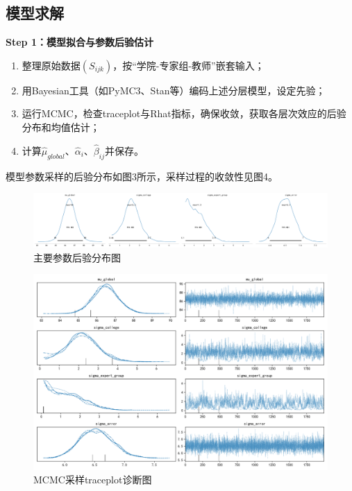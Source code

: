 \documentclass[withoutpreface,bwprint]{cumcmthesis}
\begin{document}
\subsection{模型求解}
\textbf{Step 1：模型拟合与参数后验估计}
\begin{enumerate}
    \item 整理原始数据$(S_{ijk})$，按“学院-专家组-教师”嵌套输入；
    \item 用Bayesian工具（如PyMC3、Stan等）编码上述分层模型，设定先验；
    \item 运行MCMC，检查traceplot与Rhat指标，确保收敛，获取各层次效应的后验分布和均值估计；
    \item 计算$\widehat{\mu}_{global}$、$\widehat{\alpha}_{i}$、$\widehat{\beta}_{ij}$并保存。
\end{enumerate}

模型参数采样的后验分布如图3所示，采样过程的收敛性见图4。

\begin{figure}[H]
\centering
\includegraphics[width=1\textwidth]{figures/Diagnostics/posterior_plots.png}
\caption{主要参数后验分布图}
\label{fig:posterior_plots}
\end{figure}

\begin{figure}[H]
\centering
\includegraphics[width=1\textwidth]{figures/Diagnostics/trace_plots.png}
\caption{MCMC采样traceplot诊断图}
\label{fig:trace_plots}
\end{figure}
\end{document}
